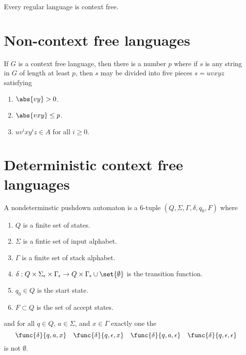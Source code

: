 \begin{corollary}
    Every regular language is context free. 
\end{corollary}

\section{Non-context free languages}
\begin{theorem}
    If \(G\) is a context free language, then there is a number \(p\) where if \(s\) is any string in \(G\) of length at least \(p\), then \(s\) may be divided into five pieces \(s =uvxyz\) satisfying 
    \begin{enumerate}
        \item \(\abs{vy} > 0\).
        \item \(\abs{vxy} \leq p\).
        \item \(uv^i x y^i z \in A\) for all \(i \geq 0\).
    \end{enumerate}   
\end{theorem}

\section{Deterministic context free languages}
\begin{definition}
    A nondeterminstic pushdown automaton is a 6-tuple \((Q,\Sigma,\Gamma,\delta,q_0,F)\) where 
    \begin{enumerate}
        \item \(Q\) is a finite set of states.
        \item \(\Sigma\) is a fintie set of input alphabet.
        \item \(\Gamma\) is a finite set of stack alphabet.
        \item \(\delta: Q \times \Sigma_{\epsilon} \times \Gamma_{\epsilon} \to Q \times \Gamma_{\epsilon} \cup \set{\emptyset}\) is the transition function.
        \item \(q_0 \in Q\) is the start state.
        \item \(F \subset Q\) is the set of accept states.
    \end{enumerate}
    and for all \(q \in Q\), \(a \in \Sigma\), and \(x \in \Gamma\) exactly one the 
    \begin{equation*}
        \func{\delta}{q,a,x} \quad \func{\delta}{q,\epsilon,x} \quad \func{\delta}{q,a,\epsilon} \quad \func{\delta}{q,\epsilon,\epsilon} 
    \end{equation*}
    is not \(\emptyset\).
\end{definition}

